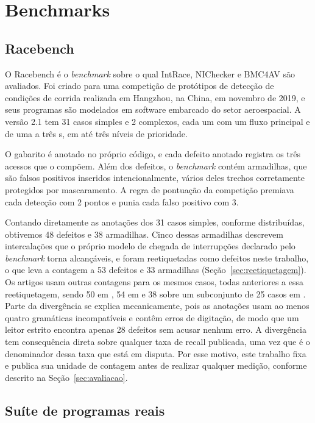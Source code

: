 \section{Benchmarks}
\label{sec:benchmarks-conceito}

\subsection{Racebench}

O Racebench \cite{racebench} é o \textit{benchmark} sobre o qual IntRace,
NIChecker e BMC4AV são avaliados. Foi criado para uma competição de protótipos
de detecção de condições de corrida realizada em Hangzhou, na China, em
novembro de 2019, e seus programas são modelados em software embarcado do setor
aeroespacial. A versão 2.1 tem 31 casos simples e 2 complexos, cada um com um
fluxo principal e de uma a três \isr s, em até três níveis de prioridade.

O gabarito é anotado no próprio código, e cada defeito anotado registra os três
acessos que o compõem. Além dos defeitos, o \textit{benchmark} contém armadilhas,
que são falsos positivos inseridos intencionalmente, vários deles trechos
corretamente protegidos por mascaramento. A regra de pontuação da competição
premiava cada detecção com 2 pontos e punia cada falso positivo com 3.

Contando diretamente as anotações dos 31 casos simples, conforme distribuídas,
obtivemos 48 defeitos e 38 armadilhas. Cinco dessas armadilhas descrevem
intercalações que o próprio modelo de chegada de interrupções declarado pelo
\textit{benchmark} torna alcançáveis, e foram reetiquetadas como defeitos neste
trabalho, o que leva a contagem a 53 defeitos e 33 armadilhas
(Seção~\ref{sec:reetiquetagem}). Os artigos usam outras contagens para os mesmos
casos, todas anteriores a essa reetiquetagem, sendo 50 em ,
54 em  e 38 sobre um subconjunto de 25 casos em
. Parte da divergência se explica mecanicamente, pois as
anotações usam ao menos quatro gramáticas incompatíveis e contêm erros de
digitação, de modo que um leitor estrito encontra apenas 28 defeitos
sem acusar nenhum erro. A divergência tem consequência direta sobre qualquer
taxa de recall publicada, uma vez que é o denominador dessa taxa que está em
disputa. Por esse motivo, este trabalho fixa e publica sua unidade de contagem
antes de realizar qualquer medição, conforme descrito na
Seção~\ref{sec:avaliacao}.

\subsection{Suíte de programas reais}

